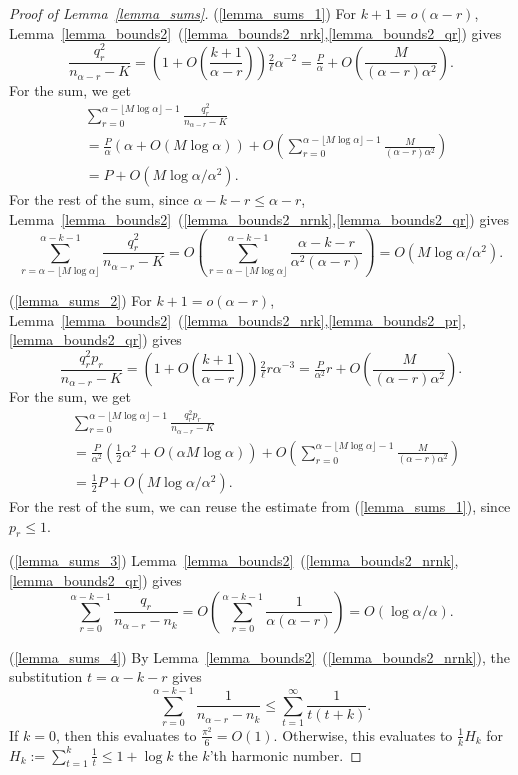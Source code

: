 \documentclass{article}
\theoremstyle{plain}
\theoremstyle{remark}
\theoremstyle{plain}
\numberwithin{equation}{section}
\begin{document}
	\begin{proof}[Proof of Lemma~\ref{lemma_sums}]
		(\ref{lemma_sums_1}) For $k+1=o(\alpha-r)$, Lemma~\ref{lemma_bounds2}~(\ref{lemma_bounds2_nrk},\ref{lemma_bounds2_qr}) gives $$\frac{q_r^2}{n_{\alpha-r}-K}=\left(1+O\left(\frac{k+1}{\alpha-r}\right)\right)\tfrac{2}{\ell}\alpha^{-2}=\tfrac{P}{\alpha}+O\left(\frac{M}{(\alpha-r)\alpha^2}\right).$$ For the sum, we get
		\begin{align}
			&\sum_{r=0}^{\alpha-\lfloor M\log\alpha\rfloor-1}\frac{q_r^2}{n_{\alpha-r}-K}
			\\&=\tfrac{P}{\alpha}(\alpha+O(M\log\alpha))+O\left(\sum_{r=0}^{\alpha-\lfloor M\log\alpha\rfloor-1}\frac{M}{(\alpha-r)\alpha^2}\right)
			\\&=P+O(M\log\alpha/\alpha^2).
		\end{align}
		For the rest of the sum, since $\alpha-k-r\leq\alpha-r$, Lemma~\ref{lemma_bounds2}~(\ref{lemma_bounds2_nrnk},\ref{lemma_bounds2_qr}) gives $$\sum_{r=\alpha-\lfloor M\log\alpha\rfloor}^{\alpha-k-1}\frac{q_r^2}{n_{\alpha-r}-K}=O\left(\sum_{r=\alpha-\lfloor M\log\alpha\rfloor}^{\alpha-k-1}\frac{\alpha-k-r}{\alpha^2(\alpha-r)}\right)=O(M\log\alpha/\alpha^2).$$
		
		(\ref{lemma_sums_2}) For $k+1=o(\alpha-r)$, Lemma~\ref{lemma_bounds2}~(\ref{lemma_bounds2_nrk},\ref{lemma_bounds2_pr},\ref{lemma_bounds2_qr}) gives $$\frac{q_r^2p_r}{n_{\alpha-r}-K}=\left(1+O\left(\frac{k+1}{\alpha-r}\right)\right)\tfrac{2}{\ell}r\alpha^{-3}=\tfrac{P}{\alpha^2}r+O\left(\frac{M}{(\alpha-r)\alpha^2}\right).$$ For the sum, we get
		\begin{align}
			&\sum_{r=0}^{\alpha-\lfloor M\log\alpha\rfloor-1}\frac{q_r^2p_r}{n_{\alpha-r}-K}
			\\&=\tfrac{P}{\alpha^2}(\tfrac12\alpha^2+O(\alpha M\log\alpha))+O\left(\sum_{r=0}^{\alpha-\lfloor M\log\alpha\rfloor-1}\frac{M}{(\alpha-r)\alpha^2}\right)
			\\&=\tfrac12P+O(M\log\alpha/\alpha^2).
		\end{align}
		For the rest of the sum, we can reuse the estimate from (\ref{lemma_sums_1}), since $p_r\leq1$.
		
		(\ref{lemma_sums_3}) Lemma~\ref{lemma_bounds2}~(\ref{lemma_bounds2_nrnk},\ref{lemma_bounds2_qr}) gives $$\sum_{r=0}^{\alpha-k-1}\frac{q_r}{n_{\alpha-r}-n_k}=O\left(\sum_{r=0}^{\alpha-k-1}\frac1{\alpha(\alpha-r)}\right)=O(\log\alpha/\alpha).$$
		
		(\ref{lemma_sums_4}) By Lemma~\ref{lemma_bounds2}~(\ref{lemma_bounds2_nrnk}), the substitution $t=\alpha-k-r$ gives $$\sum_{r=0}^{\alpha-k-1}\frac1{n_{\alpha-r}-n_k}\leq\sum_{t=1}^{\infty}\frac1{t(t+k)}.$$ If $k=0$, then this evaluates to $\tfrac{\pi^2}{6}=O(1)$. Otherwise, this evaluates to $\tfrac1{k}H_k$ for $H_k:=\sum_{t=1}^{k}\tfrac1{t}\leq1+\log k$ the $k$'th harmonic number.
	\end{proof}
	
\end{document}
